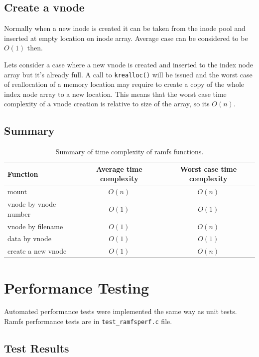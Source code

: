 \subsection{Create a vnode}

Normally when a new inode is created it can be taken from the inode pool and
inserted at empty location on inode array. Average case can be considered to be
$O(1)$ then.

Lets consider a case where a new vnode is created and inserted to the index node
array but it's already full. A call to \verb+krealloc()+ will be issued and the
worst case of reallocation of a memory location may require to create a copy
of the whole index node array to a new location. This means that the worst case
time complexity of a vnode creation is relative to size of the array, so its
$O(n)$.

\subsection{Summary}

\begin{table}
  \caption{Summary of time complexity of ramfs functions.}
  \label{table:complexity}
  \begin{tabular}{lcc}
    Function & Average time complexity & Worst case time complexity \\
    \hline
    mount                 & $O(n)$ & $O(n)$ \\
    vnode by vnode number & $O(1)$ & $O(1)$ \\
    vnode by filename     & $O(1)$ & $O(n)$ \\
    data by vnode         & $O(1)$ & $O(1)$ \\
    create a new vnode    & $O(1)$ & $O(n)$
  \end{tabular}
\end{table}


\section{Performance Testing}

Automated performance tests were implemented the same way as unit tests.
Ramfs performance tests are in \verb+test_ramfsperf.c+ file.

\subsection{Test Results}

